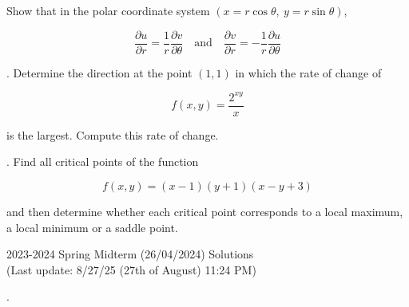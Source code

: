 \documentclass{article}
\begin{document}
\noindent Show that in the polar coordinate system $(x=r\cos\theta,\:y=r\sin\theta)$,

\[\frac{\partial u}{\partial r}=\frac1r\frac{\partial v}{\partial\theta}\quad\text{and}\quad\frac{\partial v}{\partial r}=-\frac1r\frac{\partial u}{\partial \theta}\]

\hfill

. Determine the direction at the point $(1,1)$ in which the rate of change of

\[f(x,y)=\frac{2^{xy}}x\]

\hfill

\noindent is the largest. Compute this rate of change.

\hfill

. Find all critical points of the function

\[f(x,y)=(x-1)(y+1)(x-y+3)\]

\hfill

\noindent and then determine whether each critical point corresponds to a local maximum, a local minimum or a saddle point.

\newpage

\begin{center}
2023-2024 Spring Midterm (26/04/2024) Solutions\\
(Last update: 8/27/25 (27th of August) 11:24 PM)
\end{center}

.

\hfill
\end{document}
